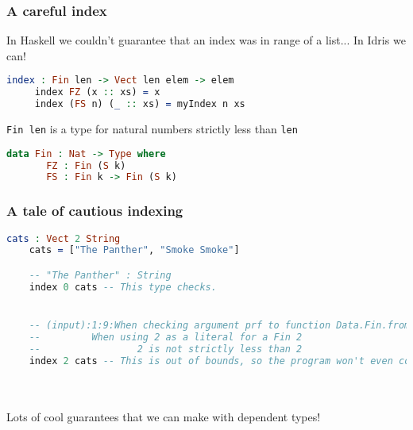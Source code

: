 \documentclass{beamer}
\begin{document}
\begin{frame}[fragile]
  \frametitle{A careful index}

  In Haskell we couldn't guarantee that an index was in range of a list... \pause In Idris we can!

  \pause
  \begin{lstlisting}[language=Idris]
     index : Fin len -> Vect len elem -> elem
     index FZ (x :: xs) = x
     index (FS n) (_ :: xs) = myIndex n xs 
   \end{lstlisting}

   \texttt{Fin len} is a type for natural numbers strictly less than \texttt{len}

   \pause

   \begin{lstlisting}[language=Idris]
     data Fin : Nat -> Type where
       FZ : Fin (S k)
       FS : Fin k -> Fin (S k)
     \end{lstlisting}

   \pause
\end{frame}

\begin{frame}[fragile]
  \frametitle{A tale of cautious indexing}

  \begin{lstlisting}[language=Idris]
    cats : Vect 2 String
    cats = ["The Panther", "Smoke Smoke"]

    -- "The Panther" : String
    index 0 cats -- This type checks.


    -- (input):1:9:When checking argument prf to function Data.Fin.fromInteger:
    --         When using 2 as a literal for a Fin 2 
    --                 2 is not strictly less than 2
    index 2 cats -- This is out of bounds, so the program won't even compile!
  \end{lstlisting}

  \pause \\~\\

  \huge{Lots of cool guarantees that we can make with dependent types!}
\end{frame}
\end{document}
